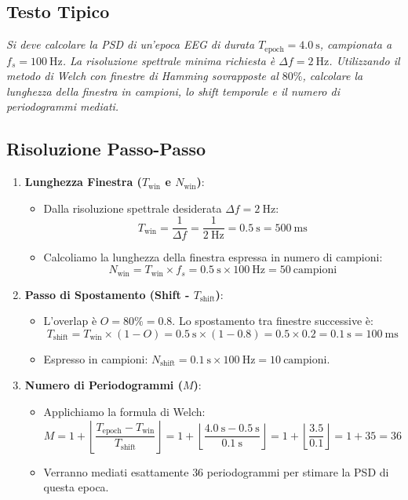 \documentclass[10pt, letterpaper]{report}
\begin{document}
\subsection*{Testo Tipico}
\emph{Si deve calcolare la PSD di un'epoca EEG di durata $T_{\text{epoch}} = 4.0\ \text{s}$, campionata a $f_s = 100\ \text{Hz}$.
La risoluzione spettrale minima richiesta è $\Delta f = 2\ \text{Hz}$.
Utilizzando il metodo di Welch con finestre di Hamming sovrapposte al $80\%$, calcolare la lunghezza della finestra in campioni, lo shift temporale e il numero di periodogrammi mediati.}

\subsection*{Risoluzione Passo-Passo}
\begin{enumerate}
    \item \textbf{Lunghezza Finestra ($T_{\text{win}}$ e $N_{\text{win}}$)}:
    \begin{itemize}
        \item Dalla risoluzione spettrale desiderata $\Delta f = 2\ \text{Hz}$:
        \[
        T_{\text{win}} = \frac{1}{\Delta f} = \frac{1}{2\ \text{Hz}} = 0.5\ \text{s} = 500\ \text{ms}
        \]
        \item Calcoliamo la lunghezza della finestra espressa in numero di campioni:
        \[
        N_{\text{win}} = T_{\text{win}} \times f_s = 0.5\ \text{s} \times 100\ \text{Hz} = 50\ \text{campioni}
        \]
    \end{itemize}
    \item \textbf{Passo di Spostamento (Shift - $T_{\text{shift}}$)}:
    \begin{itemize}
        \item L'overlap è $O = 80\% = 0.8$. Lo spostamento tra finestre successive è:
        \[
        T_{\text{shift}} = T_{\text{win}} \times (1 - O) = 0.5\ \text{s} \times (1 - 0.8) = 0.5 \times 0.2 = 0.1\ \text{s} = 100\ \text{ms}
        \]
        \item Espresso in campioni: $N_{\text{shift}} = 0.1\ \text{s} \times 100\ \text{Hz} = 10\ \text{campioni}$.
    \end{itemize}
    \item \textbf{Numero di Periodogrammi ($M$)}:
    \begin{itemize}
        \item Applichiamo la formula di Welch:
        \[
        M = 1 + \left\lfloor \frac{T_{\text{epoch}} - T_{\text{win}}}{T_{\text{shift}}} \right\rfloor = 1 + \left\lfloor \frac{4.0\ \text{s} - 0.5\ \text{s}}{0.1\ \text{s}} \right\rfloor = 1 + \left\lfloor \frac{3.5}{0.1} \right\rfloor = 1 + 35 = 36
        \]
        \item Verranno mediati esattamente $36$ periodogrammi per stimare la PSD di questa epoca.
    \end{itemize}
\end{enumerate}
\end{document}
